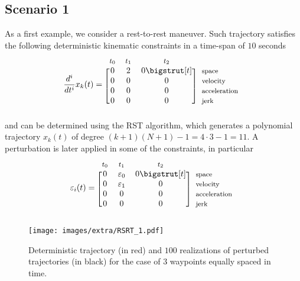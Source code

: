 \subsection{Scenario 1}
As a first example, we consider a rest-to-rest maneuver. Such trajectory satisfies the following deterministic kinematic constraints in a time-span of $10$ seconds
\begin{equation*}
  \dfrac{d^i}{d t^i}x_k(t)=
  \begin{blockarray}{*{3}{c} l}
    \begin{block}{*{3}{>{$\footnotesize}c<{$}} l}
      $t_0$ & $t_1$ & $t_2$ & \\
    \end{block}
    \begin{block}{[*{3}{c}]>{$\footnotesize}l<{$}}
      0 & 2 & 0 \bigstrut[t]& space \\
       0 & 0 & 0 & velocity \\
       0 & 0 & 0 & acceleration \\
       0 & 0 & 0 & jerk \\
    \end{block}
  \end{blockarray}
\end{equation*}
and can be determined using the RST algorithm, which generates a polynomial trajectory $x_k(t)$ of degree $(k+1)(N+1)-1=4\cdot 3-1=11$. 
A perturbation is later applied in some of the constraints, in particular
\begin{equation*}
  \varepsilon_i(t)=
  \begin{blockarray}{*{3}{c} l}
    \begin{block}{*{3}{>{$\footnotesize}c<{$}} l}
      $t_0$ & $t_1$ & $t_2$ & \\
    \end{block}
    \begin{block}{[*{3}{c}]>{$\footnotesize}l<{$}}
      0 & \varepsilon_0 & 0 \bigstrut[t]& space \\
       0 & \varepsilon_1 & 0 & velocity \\
       0 & 0 & 0 & acceleration \\
       0 & 0 & 0 & jerk \\
    \end{block}
  \end{blockarray}
\end{equation*}

\begin{figure}
\texttt{[image: images/extra/RSRT\_1.pdf]}
\centering
\caption{Deterministic trajectory (in red) and $100$ realizations of perturbed trajectories (in black) for the case of $3$ waypoints equally spaced in time.}
\label{fig:rst_RSRT_1}
\end{figure}

